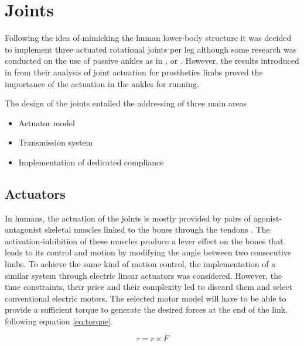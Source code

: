 \section{Joints} %
\label{sec:joints}
Following the idea of mimicking the human lower-body structure it was decided to implement three actuated rotational joints per leg although some research was conducted on the use of passive ankles as in \cite{dacbot1}, \cite{phides} or \cite{mabel}.
However, the results introduced in \cite{grimmer} from their analysis of joint actuation for prosthetics limbs proved the importance of the actuation in the ankles for running.

The design of the joints entailed the addressing of three main areas

\begin{itemize}
  \item Actuator model
  \item Transmission system
  \item Implementation of dedicated compliance
\end{itemize}


\subsection{Actuators} %
\label{sub:actuators}
In humans, the actuation of the joints is mostly provided by pairs of agonist-antagonist skeletal muscles linked to the bones through the tendons \cite{anatomy}.
The activation-inhibition of these muscles produce a lever effect on the bones that leads to its control and motion by modifying the angle between two consecutive limbs.
To achieve the same kind of motion control, the implementation of a similar system through electric linear actuators was considered.
However, the time constraints, their price and their complexity led to discard them and select conventional electric motors.
The selected motor model will have to be able to provide a sufficient torque to generate the desired forces at the end of the link, following equation \ref{eq:torque}.

\begin{equation}
\label{eq:torque}
  \tau = r \times F
\end{equation}

